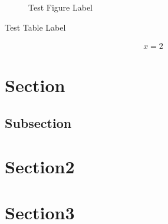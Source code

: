 
\begin{figure}
  \caption{Test Figure Label} \label{fig:figure}
\end{figure}

\begin{table}
  \caption{Test Table Label} \label{tab:table}
\end{table}

\begin{align}
  x = 2 \label{eq:equation}
\end{align}

\section{Section} \label{sec:sectionlabel}

\subsection{Subsection}  \label{sec:subsectionlabel}

\section{Section2} \label{sec:online1} \section{Section3} \label{sec:online2}
